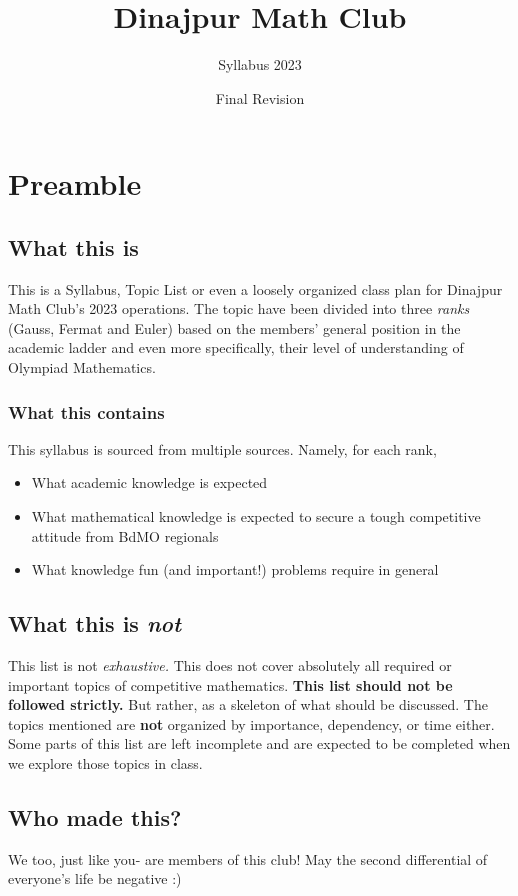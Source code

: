 \documentclass[oneside]{book}
\title{Dinajpur Math Club}
\author{Syllabus 2023}
\date{Final Revision}
\begin{document}
\maketitle

\chapter{Preamble}
\section{What this is}
    This is a Syllabus, Topic List or even a loosely organized class plan for Dinajpur Math Club's 2023 operations. \newline
    The topic have been divided into three \emph{ranks} (Gauss, Fermat and Euler) based on the members' general position in the academic ladder and even more specifically, their level of understanding of Olympiad Mathematics.
    \subsection{What this contains}
    This syllabus is sourced from multiple sources. Namely, for each rank,
    \begin{itemize}
        \item What academic knowledge is expected
        \item What mathematical knowledge is expected to secure a tough competitive attitude from BdMO regionals
        \item What knowledge fun (and important!) problems require in general
    \end{itemize}
    
\section{What this is \emph{not}}
    This list is not \emph{exhaustive.} This does not cover absolutely all required or important topics of competitive mathematics. \textbf{This list should not be followed strictly.} But rather, as a skeleton of what should be discussed. The topics mentioned are \textbf{not} organized by importance, dependency, or time either. Some parts of this list are left incomplete and are expected to be completed when we explore those topics in class.
    
\section{Who made this?}
    We too, just like you- are members of this club! May the second differential of everyone's life be negative :)
\end{document}
